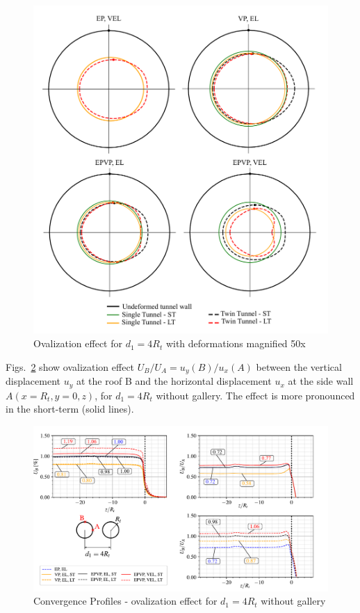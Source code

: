 \documentclass[a4paper,fleqn]{cas-sc}
\begin{document}
\begin{figure}[h!]
	\centering
	\includegraphics[scale=0.4]{ovalization.pdf}
	\caption{Ovalization effect for $d_1 = 4R_t$ with deformations magnified 50x}
	\label{ovalization}
\end{figure}
\FloatBarrier
Figs.~\ref{UB-UAUB-D1_4RT} show ovalization effect $U_B/U_A = u_y(B)/u_x(A)$ between the vertical displacement $u_y$ at the roof B and the horizontal displacement $u_x$ at the side wall $A(x=R_t,y=0,z)$, for $d_1 = 4R_t$ without gallery. The effect is more pronounced in the short-term (solid lines).
\begin{figure}[h!]
	\centering
	\includegraphics[scale=0.65]{Convergence Profiles - UB - UAUB - $d_1=4R_t - ST_Lt$.pdf}
	\caption{Convergence Profiles - ovalization effect for $d_1 = 4R_t$ without gallery}
	\label{UB-UAUB-D1_4RT}
\end{figure}
\FloatBarrier
\end{document}
